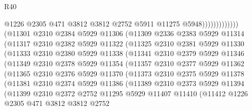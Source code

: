 \begin{lexlean}{R40}
\begin{coremodule}
                                  @1226
                                  @2305
                                  @471
                                  @3812
                                  @3812
                                  @2752
                                  @5911
                                  @11275
                                  @5948)))))))))))))
        (@11301
          @2310
          @2384
          @5929
          @11306
          (@11309
            @2336
            @2383
            @5929
            @11314
            (@11317
              @2310
              @2382
              @5929
              @11322
              (@11325
                @2310
                @2381
                @5929
                @11330
                (@11333
                  @2310
                  @2380
                  @5929
                  @11338
                  (@11341
                    @2310
                    @2379
                    @5929
                    @11346
                    (@11349
                      @2310
                      @2378
                      @5929
                      @11354
                      (@11357
                        @2310
                        @2377
                        @5929
                        @11362
                        (@11365
                          @2310
                          @2376
                          @5929
                          @11370
                          (@11373
                            @2310
                            @2375
                            @5929
                            @11378
                            (@11381
                              @2310
                              @2374
                              @5929
                              @11386
                              (@11389
                                @2310
                                @2373
                                @5929
                                @11394
                                (@11399
                                  @2310
                                  @2372
                                  @2752
                                  @11295
                                  @5929
                                  @11407
                                  @11410
                                  (@11412
                                    @1226
                                    @2305
                                    @471
                                    @3812
                                    @3812
                                    @2752

\end{coremodule}
\end{lexlean}
